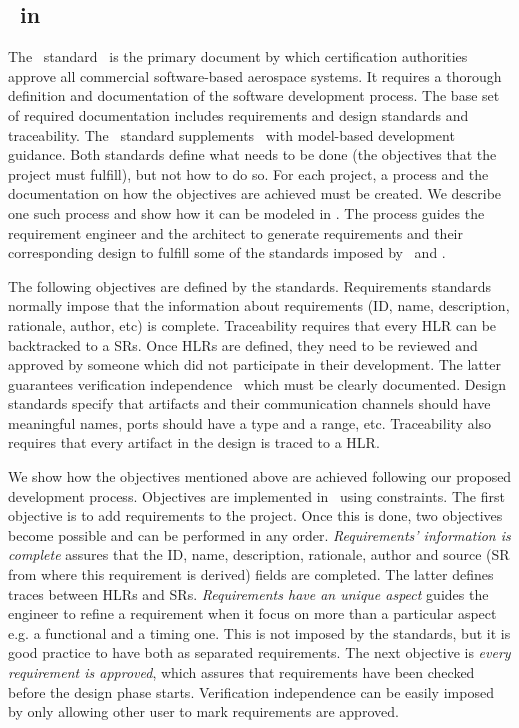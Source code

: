 
\subsection{\doone\ in \afthree}

The \doone\ standard~\cite{do178c} is the primary document by which certification authorities approve all commercial software-based aerospace systems.
It requires a thorough definition and documentation of the software development process. 
The base set of required documentation includes requirements and design standards and traceability.
The \dothree\ standard supplements \doone\ with model-based development guidance.
Both standards define what needs to be done (the objectives that the project must fulfill), but not how to do so.
For each project, a process and the documentation on how the objectives are achieved must be created.
We describe one such process and show how it can be modeled in \afthree.
The process guides the requirement engineer and the architect to generate requirements and their corresponding design to fulfill some of the standards imposed by \doone\ and \dothree.

The following objectives are defined by the standards.
Requirements standards normally impose that the information about requirements (ID, name, description, rationale, author, etc) is complete.
Traceability requires that every HLR can be backtracked to a SRs.
Once HLRs are defined, they need to be reviewed and approved by someone which did not participate in their development. 
The latter guarantees verification independence~\cite{cast26} which must be clearly documented.
Design standards specify that artifacts and their communication channels should have meaningful names, ports should have a type and a range, etc.
Traceability also requires that every artifact in the design is traced to a HLR.

We show how the objectives mentioned above are achieved following our proposed development process.
Objectives are implemented in \afthree\ using constraints.
The first objective is to add requirements to the project. 
Once this is done, two objectives become possible and can be performed in any order. 
\emph{Requirements' information is complete} assures that the ID, name, description, rationale, author and source (SR from where this requirement is derived) fields are completed. 
The latter defines traces between HLRs and SRs.
\emph{Requirements have an unique aspect} guides the engineer to refine a requirement when it focus on more than a particular aspect e.g. a functional and a timing one.
This is not imposed by the standards, but it is good practice to have both as separated requirements.
The next objective is \emph{every requirement is approved}, which assures that requirements have been checked before the design phase starts.
Verification independence can be easily imposed by only allowing other user to mark requirements are approved.

